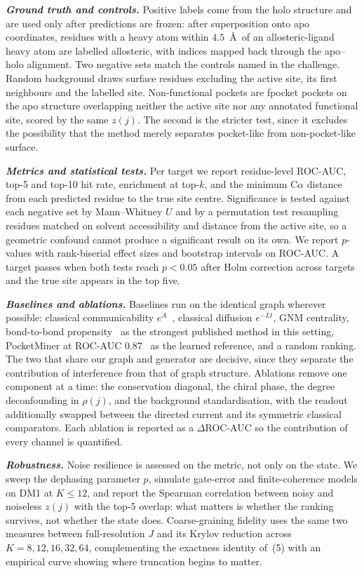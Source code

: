 \documentclass[10pt,a4paper]{article}
\newcommand{\lead}[1]{\textbf{\textit{#1}}}
\begin{document}
\lead{Ground truth and controls.} Positive labels come from the holo structure and are used only after predictions are frozen: after
superposition onto apo coordinates, residues with a heavy atom within $4.5$~\AA\ of an
allosteric-ligand heavy atom are labelled allosteric, with indices mapped back through the apo--holo
alignment. Two negative sets match the controls named in the challenge. Random background draws
surface residues excluding the active site, its first neighbours and the labelled site.
Non-functional pockets are fpocket pockets on the apo structure overlapping neither the active site
nor any annotated functional site, scored by the same $z(j)$. The second is the stricter test, since
it excludes the possibility that the method merely separates pocket-like from non-pocket-like
surface.

\lead{Metrics and statistical tests.} Per target we report residue-level ROC-AUC, top-5 and top-10 hit rate, enrichment at top-$k$, and the
minimum C$\alpha$ distance from each predicted residue to the true site centre. Significance is
tested against each negative set by Mann--Whitney $U$ and by a permutation test resampling residues
matched on solvent accessibility and distance from the active site, so a geometric confound cannot
produce a significant result on its own. We report $p$-values with rank-biserial effect sizes and
bootstrap intervals on ROC-AUC. A target passes when both tests reach $p<0.05$ after Holm correction
across targets and the true site appears in the top five.

\lead{Baselines and ablations.} Baselines run on the identical graph wherever possible: classical communicability
$e^{A}$~\cite{estrada2008}, classical diffusion $e^{-Lt}$, GNM centrality, bond-to-bond
propensity~\cite{amor2016} as the strongest published method in this setting, PocketMiner at ROC-AUC
$0.87$~\cite{meller2023} as the learned reference, and a random ranking. The two that share our graph
and generator are decisive, since they separate the contribution of interference from that of graph
structure. Ablations remove one component at a time: the conservation diagonal, the chiral phase, the
degree deconfounding in $\rho(j)$, and the background standardisation, with the readout additionally
swapped between the directed current and its symmetric classical comparators. Each ablation is
reported as a $\Delta$ROC-AUC so the contribution of every channel is quantified.

\lead{Robustness.} Noise resilience is assessed on the metric, not only on the state. We sweep the dephasing parameter
$p$, simulate gate-error and finite-coherence models on DM1 at $K\le 12$, and report the Spearman
correlation between noisy and noiseless $z(j)$ with the top-5 overlap: what matters is whether the
ranking survives, not whether the state does. Coarse-graining fidelity uses the same two measures
between full-resolution $J$ and its Krylov reduction across $K=8,12,16,32,64$, complementing the
exactness identity of~(5) with an empirical curve showing where truncation begins to matter.
\end{document}
